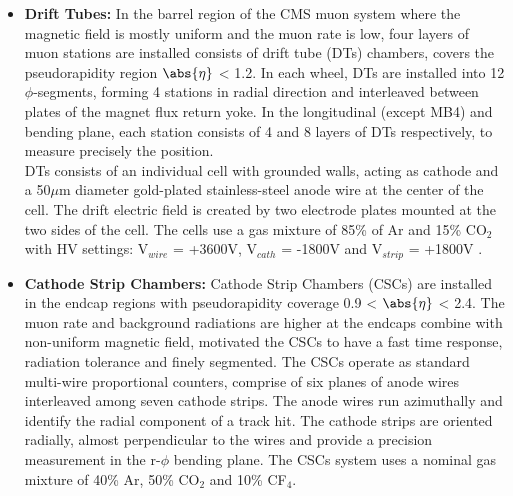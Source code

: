\begin{itemize}
\item{\textbf{Drift Tubes:}}
In the barrel region of the CMS muon system where the magnetic field is mostly uniform and the muon rate is low, four layers of muon stations are installed consists of drift tube (DTs) chambers, covers the pseudorapidity region $\abs{\eta}$ < 1.2. In each wheel, DTs are installed into 12 $\phi$-segments, forming 4 stations in radial direction and interleaved between plates of the magnet flux return yoke. In the longitudinal (except MB4) and bending plane, each station consists of 4 and 8 layers of DTs respectively, to measure precisely the position.\\
DTs consists of an individual cell with grounded walls, acting as cathode and a 50$\mu$m diameter gold-plated stainless-steel anode wire at the center of the cell. The drift electric field is created by two electrode plates mounted at the two sides of the cell. The cells use a gas mixture of 85\% of Ar and 15\% CO$_{2}$ with HV settings: V$_{wire}$ = +3600V, V$_{cath}$ = -1800V and V$_{strip}$ = +1800V \cite{muon-sys}.  
\item{\textbf{Cathode Strip Chambers:}}
Cathode Strip Chambers (CSCs) are installed in the endcap regions with pseudorapidity coverage 0.9 < $\abs{\eta}$ < 2.4. The muon rate and background radiations are higher at the endcaps combine with non-uniform magnetic field, motivated the CSCs to have a fast time response, radiation tolerance and finely segmented. The CSCs operate as standard multi-wire proportional counters, comprise of six planes of anode wires interleaved among seven cathode strips. The anode wires run azimuthally and identify the radial component of a track hit. The cathode strips are oriented radially, almost perpendicular to the wires and provide a precision measurement in the r-$\phi$ bending plane. The CSCs system uses a nominal gas mixture of 40\% Ar, 50\% CO$_{2}$ and 10\% CF$_{4}$.


\end{itemize}
